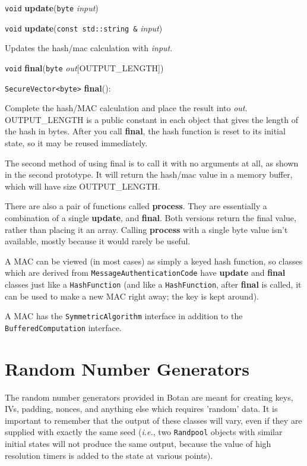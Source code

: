 \documentclass{article}
\newcommand{\function}[1]{\textbf{#1}}
\newcommand{\type}[1]{\texttt{#1}}
\renewcommand{\arg}[1]{\textsl{#1}}
\newcommand{\ie}[0]{\emph{i.e.}}
\begin{document}
\noindent
\type{void} \function{update}(\type{byte} \arg{input})

\noindent
\type{void} \function{update}(\type{const std::string \&} \arg{input})

Updates the hash/mac calculation with \arg{input}.

\noindent
\type{void} \function{final}(\type{byte} \arg{out}[OUTPUT\_LENGTH])

\noindent
\type{SecureVector<byte>} \function{final}():

Complete the hash/MAC calculation and place the result into \arg{out}.
OUTPUT\_LENGTH is a public constant in each object that gives the length of the
hash in bytes. After you call \function{final}, the hash function is reset to
its initial state, so it may be reused immediately.

The second method of using final is to call it with no arguments at all, as
shown in the second prototype. It will return the hash/mac value in a memory
buffer, which will have size OUTPUT\_LENGTH.

There are also a pair of functions called \function{process}. They are
essentially a combination of a single \function{update}, and \function{final}.
Both versions return the final value, rather than placing it an array. Calling
\function{process} with a single byte value isn't available, mostly because it
would rarely be useful.

A MAC can be viewed (in most cases) as simply a keyed hash function, so classes
which are derived from \type{MessageAuthenticationCode} have \function{update}
and \function{final} classes just like a \type{HashFunction} (and like a
\type{HashFunction}, after \function{final} is called, it can be used to make a
new MAC right away; the key is kept around).

A MAC has the \type{SymmetricAlgorithm} interface in addition to the
\type{BufferedComputation} interface.

\pagebreak
\section{Random Number Generators}

The random number generators provided in Botan are meant for creating keys,
IVs, padding, nonces, and anything else which requires 'random' data. It is
important to remember that the output of these classes will vary, even if they
are supplied with exactly the same seed (\ie, two \type{Randpool} objects with
similar initial states will not produce the same output, because the value of
high resolution timers is added to the state at various points).
\end{document}

